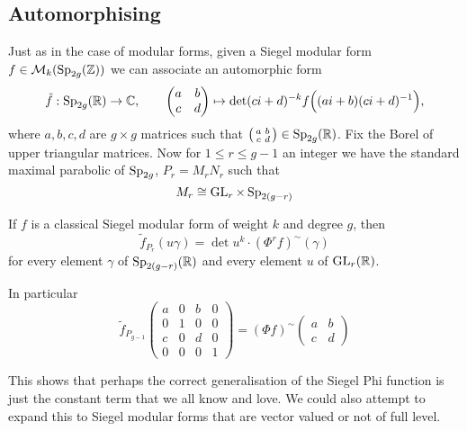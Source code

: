 \subsection{Automorphising}
Just as in the case of modular forms, given a Siegel modular form \(f\in \mathcal{M}_k(\Sp_{2g}(\Z))\) we can associate an automorphic form
\[\tilde{f} : \Sp_{2g}(\R)\to\C, \qquad \begin{pmatrix} a & b\\ c & d\end{pmatrix}\mapsto \det(ci+d)^{-k} f\Bigl((ai+b)(ci+d)\inv\Bigr), \]
where \(a,b,c,d\) are \(g\times g\) matrices such that \(\bigl(\begin{smallmatrix} a & b\\ c & d\end{smallmatrix}\bigr)\in\Sp_{2g}(\R)\). Fix the Borel of upper triangular matrices. Now for \(1\leq r\leq g-1\) an integer we have the standard maximal parabolic of \(\operatorname{Sp}_{2g}\), \(P_r = M_rN_r\) such that 
\[M_r \cong \operatorname{GL}_r\times \operatorname{Sp}_{2(g-r)}\]

\begin{Theorem}[Zhang]
	If \(f\) is a classical Siegel modular form of weight \(k\) and degree \(g\), then
	\begin{equation} 
		\tilde f_{P_r}(u\gamma) = \det u^k\cdot (\Phi^{r} f)^\sim(\gamma)
	\end{equation}
	for every element \(\gamma\) of \(\Sp_{2(g-r)}(\R)\) and every element \(u\) of \(\GL_{r}(\R)\).
	
	In particular 
	\[\tilde{f}_{P_{g-1}}\begin{pmatrix} a & 0 & b & 0\\ 0 & 1 & 0 & 0\\ c & 0 & d & 0\\ 0 & 0 & 0 & 1\end{pmatrix} = (\Phi f)^\sim\begin{pmatrix}
		a & b\\
		c& d
	\end{pmatrix}\]
\end{Theorem}

This shows that perhaps the correct generalisation of the Siegel Phi function is just the constant term that we all know and love. We could also attempt to expand this to Siegel modular forms that are vector valued or not of full level. 

